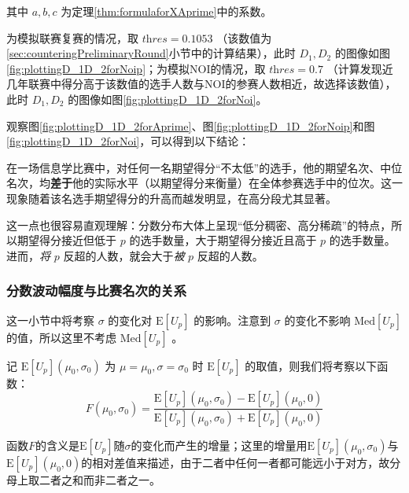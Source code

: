             其中 $a,b,c$ 为定理\ref{thm:formulaforXAprime}中的系数。

            \vspace{1.5ex}

            为模拟联赛复赛的情况，取 $\textit{thres}=0.1053$ （该数值为\ref{sec:counteringPreliminaryRound}小节中的计算结果），此时 $D_1,D_2$ 的图像如图\ref{fig:plottingD_1D_2forNoip}；为模拟NOI的情况，取 $\textit{thres}=0.7$ （计算发现近几年联赛中得分高于该数值的选手人数与NOI的参赛人数相近，故选择该数值），此时 $D_1,D_2$ 的图像如图\ref{fig:plottingD_1D_2forNoi}。

            \vspace{1.5ex}

            观察图\ref{fig:plottingD_1D_2forAprime}、图\ref{fig:plottingD_1D_2forNoip}和图\ref{fig:plottingD_1D_2forNoi}，可以得到以下结论：

            \begin{tcolorbox}[colback=white,colframe=black,boxrule=0.5pt,arc=0pt]
                在一场信息学比赛中，对任何一名期望得分“不太低”的选手，他的期望名次、中位名次，均\textbf{差于}他的实际水平（以期望得分来衡量）在全体参赛选手中的位次。这一现象随着该名选手期望得分的升高而越发明显，在高分段尤其显著。
            \end{tcolorbox}

            这一点也很容易直观理解：分数分布大体上呈现“低分稠密、高分稀疏”的特点，所以期望得分接近但低于 $p$ 的选手数量，大于期望得分接近且高于 $p$ 的选手数量。进而，\emph{将} $p$ 反超的人数，就会大于\emph{被} $p$ 反超的人数。

        \subsubsection{分数波动幅度与比赛名次的关系}

            这一小节中将考察 $\sigma$ 的变化对 $\mathrm{E}\left[U_p\right]$ 的影响。注意到 $\sigma$ 的变化不影响 $\mathrm{Med}\left[U_p\right]$ 的值，所以这里不考虑 $\mathrm{Med}\left[U_p\right]$ 。

            记 $\mathrm{E}\left[U_p\right](\mu_0,\sigma_0)$ 为 $\mu=\mu_0,\sigma=\sigma_0$ 时 $\mathrm{E}\left[U_p\right]$ 的取值，则我们将考察以下函数：
            $$
            F(\mu_0,\sigma_0)=\frac{\mathrm{E}\left[U_p\right](\mu_0,\sigma_0)-\mathrm{E}\left[U_p\right](\mu_0,0)}{\mathrm{E}\left[U_p\right](\mu_0,\sigma_0)+\mathrm{E}\left[U_p\right](\mu_0,0)}
            $$

            函数$F$的含义是$\mathrm{E}\left[U_p\right]$随$\sigma$的变化而产生的增量；这里的增量用$\mathrm{E}\left[U_p\right](\mu_0,\sigma_0)$与$\mathrm{E}\left[U_p\right](\mu_0,0)$的相对差值来描述，由于二者中任何一者都可能远小于对方，故分母上取二者之和而非二者之一。

